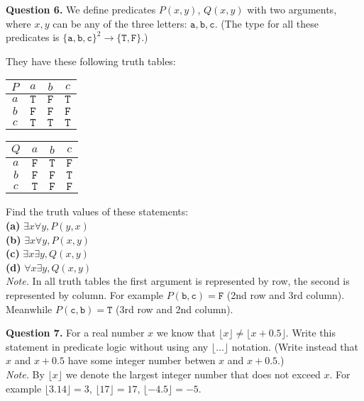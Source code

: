 \documentclass[jou]{apa6}
\begin{document}
\vspace{10pt}
{\bf Question 6.} We define predicates $P(x,y)$, 
$Q(x,y)$ with two arguments, 
where $x,y$ can be any of the three letters: 
$\mathtt{a},\mathtt{b},\mathtt{c}$. 
(The type for all these predicates is 
$\{ \mathtt{a},\mathtt{b},\mathtt{c} \}^2 
\rightarrow \{ \mathtt{T},\mathtt{F} \}$.)

They have these following truth tables:
\begin{center}
\begin{tabular}{c|ccc}
$P$ & $a$ & $b$ & $c$ \\ \hline
$a$ & $\mathtt{T}$ & $\mathtt{F}$ & $\mathtt{T}$ \\
$b$ & $\mathtt{F}$ & $\mathtt{F}$ & $\mathtt{F}$ \\
$c$ & $\mathtt{T}$ & $\mathtt{T}$ & $\mathtt{T}$
\end{tabular}
\hspace{2ex}
\begin{tabular}{c|ccc}
$Q$ & $a$ & $b$ & $c$ \\ \hline
$a$ & $\mathtt{F}$ & $\mathtt{T}$ & $\mathtt{F}$ \\
$b$ & $\mathtt{F}$ & $\mathtt{F}$ & $\mathtt{T}$ \\
$c$ & $\mathtt{T}$ & $\mathtt{F}$ & $\mathtt{F}$
\end{tabular}
\end{center}
Find the truth values of these statements:\\
{\bf (a)} $\exists x \forall y, P(y,x)$\\
{\bf (b)} $\exists x \forall y, P(x,y)$\\
{\bf (c)} $\exists x \exists y, Q(x,y)$\\
{\bf (d)} $\forall x \exists y, Q(x,y)$\\
{\em Note.} In all truth tables the first argument is
represented by row, the second is represented by column. 
For example $P(\mathtt{b}, \mathtt{c}) = \mathtt{F}$ (2nd row
and 3rd column). Meanwhile 
$P(\mathtt{c}, \mathtt{b}) = \mathtt{T}$ (3rd row and 2nd column). 



\vspace{10pt}
{\bf Question 7.} 
For a real number $x$ we know that $\lfloor x \rfloor \neq 
\lfloor x + 0.5 \rfloor$. Write this statement in 
predicate logic without using any $\lfloor \ldots \rfloor$ 
notation. (Write instead that $x$ and $x+0.5$ have some integer number 
betwen $x$  and $x+0.5$.)\\
{\em Note.} By $\lfloor x \rfloor$ we denote the 
largest integer number that does not exceed $x$. 
For example $\lfloor 3.14 \rfloor = 3$, $\lfloor 17 \rfloor = 17$, 
$\lfloor -4.5 \rfloor = -5$. 
\end{document}
